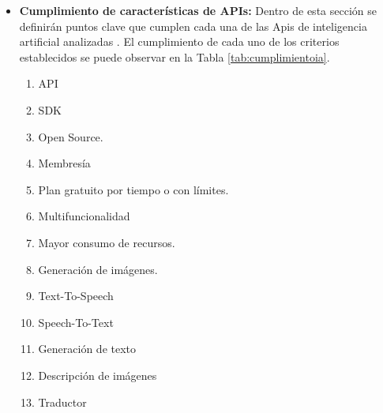 \documentclass[lettersize,journal]{IEEEtran}
\begin{document}
\begin{itemize}
\begin{itemize}
		\item Librerías de Programación - Descripción de imágenes:
		\begin{itemize}
			\item \textbf{IA-019} blip-image-captioning-base
		\end{itemize}
		
		\item Librerías de Programación - Traducción de texto:
		\begin{itemize}
			\item \textbf{IA-020} opus-mt-en-es
			\item \textbf{IA-021} opus-mt-es-en
		\end{itemize}
	\end{itemize}
	
	\item \textbf{Cumplimiento de características de APIs:} 
	\noindent Dentro de esta sección se definirán puntos clave que cumplen cada una de las Apis de inteligencia artificial analizadas \cite{GozaloBrizuela2023GenAI,Kumar2025}.  El cumplimiento de cada uno de los criterios establecidos se puede observar en la Tabla \ref{tab:cumplimientoia}.
	
	\begin{enumerate}
		\item API
		\item SDK
		\item Open Source.
		\item Membresía
		\item Plan gratuito por tiempo o con límites.
		\item Multifuncionalidad
		\item Mayor consumo de recursos.
		\item Generación de imágenes.
		\item Text-To-Speech
		\item Speech-To-Text
		\item Generación de texto
		\item Descripción de imágenes
		\item Traductor
	\end{enumerate}
	

\end{itemize}
\end{document}
